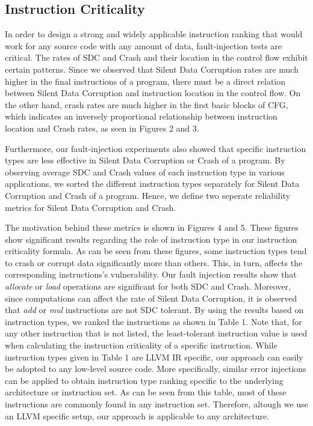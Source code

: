 \subsection{Instruction Criticality}\label{sec:est_sharing}


In order to design a strong and widely applicable instruction ranking that would work for any source code with any amount of data, fault-injection tests are critical. The rates of SDC and Crash and their location in the control flow exhibit certain patterns. Since we observed that Silent Data Corruption rates are much higher in the final instructions of a program, there must be a direct relation between Silent Data Corruption and instruction location in the control flow. On the other hand, crash rates are much higher in the first basic blocks of CFG, which indicates an inversely proportional relationship between instruction location and Crash rates, as seen in Figures 2 and 3. 

Furthermore, our fault-injection experiments also showed that specific instruction types are less effective in Silent Data Corruption or Crash of a program. By observing average SDC and Crash values of each instruction type in various applications, we sorted the different instruction types separately for Silent Data Corruption and Crash of a program. Hence, we define two seperate reliability metrics for Silent Data Corruption and Crash.

The motivation behind these metrics is shown in Figures 4 and 5. These figures show significant results regarding the role of instruction type in our instruction criticality formula. As can be seen from these figures, some instruction types tend to crash or corrupt data significantly more than others. This, in turn, affects the corresponding instructions's vulnerability. Our fault injection results show that \emph{allocate} or \emph{load} operations are significant for both SDC and Crash. Moreover, since computations can affect the rate of Silent Data Corruption, it is observed that \emph{add} or \emph{mul} instructions are not SDC tolerant. By using the results based on instruction types, we ranked the instructions as shown in Table 1. Note that, for any other instruction that is not listed, the least-tolerant instruction value is used when calculating the instruction criticality of a specific instruction. While instruction types given in Table 1 are LLVM IR specific, our approach can easily be adopted to any low-level source code. More specifically, similar error injections can be applied to obtain instruction type ranking specific to the underlying architecture or instruction set. As can be seen from this table, most of these instructions are commonly found in any instruction set. Therefore, altough we use an LLVM specific setup, our approach is applicable to any architecture.

